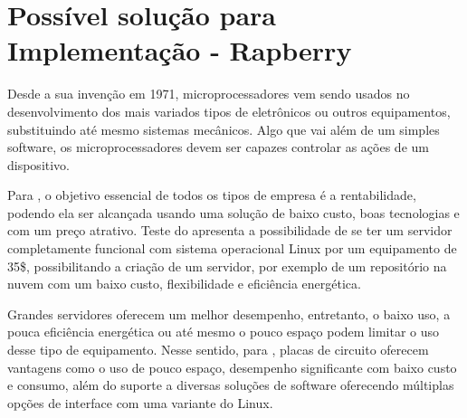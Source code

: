 

 

\section{Possível solução para Implementação - Rapberry}
Desde a sua invenção em 1971, microprocessadores vem sendo usados no desenvolvimento dos mais variados tipos de eletrônicos ou outros equipamentos, substituindo até mesmo sistemas mecânicos. Algo que vai além de um simples software, os microprocessadores devem ser capazes controlar as ações de um dispositivo. \cite{rosenstark2007}

Para \cite{aristotelous2016}, o objetivo essencial de todos os tipos de empresa é a rentabilidade, podendo ela ser alcançada usando uma solução de baixo custo, boas tecnologias e com um preço atrativo. Teste do \cite{aristotelous2016} apresenta a possibilidade de se ter um servidor completamente funcional com sistema operacional Linux por um equipamento de 35\$, possibilitando a criação de um servidor, por exemplo de um repositório na nuvem com um baixo custo, flexibilidade e eficiência energética. 

Grandes servidores oferecem um melhor desempenho, entretanto, o baixo uso, a pouca eficiência energética ou até mesmo o pouco espaço podem limitar o uso desse tipo de equipamento. Nesse sentido, para \cite{cusick2014}, placas de circuito oferecem vantagens como o uso de pouco espaço, desempenho significante com baixo custo e consumo, além do suporte a diversas soluções de software oferecendo múltiplas opções de interface com uma variante do Linux. 